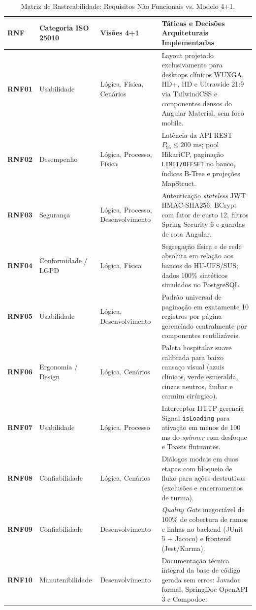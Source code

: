 \begin{table}[htb]
\centering
\small
\caption{Matriz de Rastreabilidade: Requisitos Não Funcionais vs. Modelo 4+1.}
\label{tab_rastreabilidade_arq}
\begin{tabularx}{\textwidth}{l >{\raggedright\arraybackslash}p{2.8cm} >{\raggedright\arraybackslash}p{2.8cm} X}
\toprule
\textbf{RNF} & \textbf{Categoria ISO 25010} & \textbf{Visões 4+1} & \textbf{Táticas e Decisões Arquiteturais Implementadas} \\
\midrule
\textbf{RNF01} & Usabilidade & Lógica, Física, Cenários & Layout projetado exclusivamente para desktops clínicos WUXGA, HD+, HD e Ultrawide 21:9 via TailwindCSS e componentes densos do Angular Material, sem foco mobile. \\
\midrule
\textbf{RNF02} & Desempenho & Lógica, Processo, Física & Latência da API REST $P_{95} \le 200\text{ ms}$; pool HikariCP, paginação \texttt{LIMIT/OFFSET} no banco, índices B-Tree e projeções MapStruct. \\
\midrule
\textbf{RNF03} & Segurança & Lógica, Processo, Desenvolvimento & Autenticação \textit{stateless} JWT HMAC-SHA256, BCrypt com fator de custo 12, filtros Spring Security 6 e guardas de rota Angular. \\
\midrule
\textbf{RNF04} & Conformidade / LGPD & Lógica, Física & Segregação física e de rede absoluta em relação aos bancos do HU-UFS/SUS; dados 100\% sintéticos simulados no PostgreSQL. \\
\midrule
\textbf{RNF05} & Usabilidade & Lógica, Desenvolvimento & Padrão universal de paginação em exatamente 10 registros por página gerenciado centralmente por componentes reutilizáveis. \\
\midrule
\textbf{RNF06} & Ergonomia / Design & Lógica, Cenários & Paleta hospitalar suave calibrada para baixo cansaço visual (azuis clínicos, verde esmeralda, cinzas neutros, âmbar e carmim cirúrgico). \\
\midrule
\textbf{RNF07} & Usabilidade & Lógica, Processo & Interceptor HTTP gerencia Signal \texttt{isLoading} para ativação em menos de 100 ms do \textit{spinner} com desfoque e Toasts flutuantes. \\
\midrule
\textbf{RNF08} & Confiabilidade & Lógica, Cenários & Diálogos modais em duas etapas com bloqueio de fluxo para ações destrutivas (exclusões e encerramentos de turma). \\
\midrule
\textbf{RNF09} & Confiabilidade & Desenvolvimento & \textit{Quality Gate} inegociável de 100\% de cobertura de ramos e linhas no backend (JUnit 5 + Jacoco) e frontend (Jest/Karma). \\
\midrule
\textbf{RNF10} & Manutenibilidade & Desenvolvimento & Documentação técnica integral da base de código gerada sem erros: Javadoc formal, SpringDoc OpenAPI 3 e Compodoc. \\
\bottomrule
\end{tabularx}
\end{table}

